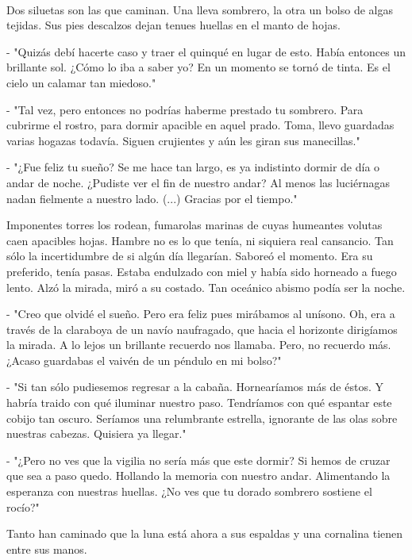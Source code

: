 \\[0.1cm]

Dos siluetas son las que caminan. Una lleva sombrero, la otra un bolso de algas tejidas. Sus pies descalzos dejan tenues huellas en el manto de hojas.

- "Quizás debí hacerte caso y traer el quinqué en lugar de esto. Había entonces un brillante sol. ¿Cómo lo iba a saber yo? En un momento se tornó de tinta. Es el cielo un calamar tan miedoso."

- "Tal vez, pero entonces no podrías haberme prestado tu sombrero. Para cubrirme el rostro, para dormir apacible en aquel prado. Toma, llevo guardadas varias hogazas todavía. Siguen crujientes y aún les giran sus manecillas."

- "¿Fue feliz tu sueño? Se me hace tan largo, es ya indistinto dormir de día o andar de noche. ¿Pudiste ver el fin de nuestro andar? Al menos las luciérnagas nadan fielmente a nuestro lado. (...) Gracias por el tiempo."

Imponentes torres los rodean, fumarolas marinas de cuyas humeantes volutas caen apacibles hojas. Hambre no es lo que tenía, ni siquiera real cansancio. Tan sólo la incertidumbre de si algún día llegarían. Saboreó el momento. Era su preferido, tenía pasas. Estaba endulzado con miel y había sido horneado a fuego lento. Alzó la mirada, miró a su costado. Tan oceánico abismo podía ser la noche.

- "Creo que olvidé el sueño. Pero era feliz pues mirábamos al unísono. Oh, era a través de la claraboya de un navío naufragado, que hacia el horizonte dirigíamos la mirada. A lo lejos un brillante recuerdo nos llamaba. Pero, no recuerdo más. ¿Acaso guardabas el vaivén de un péndulo en mi bolso?"

- "Si tan sólo pudiesemos regresar a la cabaña. Hornearíamos más de éstos. Y habría traido con qué iluminar nuestro paso. Tendríamos con qué espantar este cobijo tan oscuro. Seríamos una relumbrante estrella, ignorante de las olas sobre nuestras cabezas. Quisiera ya llegar."

- "¿Pero no ves que la vigilia no sería más que este dormir? Si hemos de cruzar que sea a paso quedo. Hollando la memoria con nuestro andar. Alimentando la esperanza con nuestras huellas. ¿No ves que tu dorado sombrero sostiene el rocío?"

Tanto han caminado que la luna está ahora a sus espaldas y una cornalina tienen entre sus manos.\\[0.5cm]